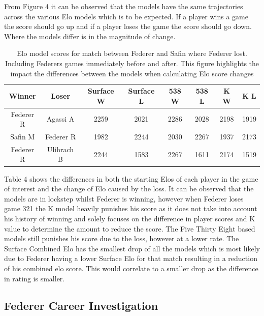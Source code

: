 \documentclass[12pt,a4paper]{article}
\begin{document}
From Figure 4 it can be observed that the models have the same trajectories across the
various Elo models which is to be expected. If a player wins a game the score should go
up and if a player loses the game the score should go down. Where the models differ is
in the magnitude of change.
\\
\begin{table}[H]
  \begin{tabular}{||c c c c c c c c||}
    \hline
    Winner    & Loser      & Surface W & Surface L & 538 W & 538 L & K W  & K L  \\
    \hline\hline
    Federer R & Agassi A   & 2259      & 2021      & 2286  & 2028  & 2198 & 1919 \\
    Safin M   & Federer R  & 1982      & 2244      & 2030  & 2267  & 1937 & 2173 \\
    Federer R & Ulihrach B & 2244      & 1583      & 2267  & 1611  & 2174 & 1519 \\

    \hline
  \end{tabular}
  \caption{Elo model scores for match between Federer and Safin where Federer lost.
    Including Federers games immediately before and after.
    This figure highlights the impact the differences between the models when calculating
    Elo score changes}
\end{table}
Table 4 shows the differences in both the starting Elos of each player in the game of
interest and the change of Elo caused by the loss.
It can be observed that the models are in lockstep whilst
Federer is winning, however when Federer loses game 321 the K model heavily punishes
his score as it does not take into account his history of winning and solely focuses on
the difference in player scores and K value to determine the amount to reduce the score.
The Five Thirty Eight based models still punishes his score due to the loss, however at a
lower rate. The Surface Combined Elo has the smallest drop of all the models which is most
likely due to Federer having a lower Surface Elo for that match resulting in a reduction
of his combined elo score. This would correlate to a smaller drop as the difference in
rating is smaller.

\subsection{Federer Career Investigation}
\end{document}
